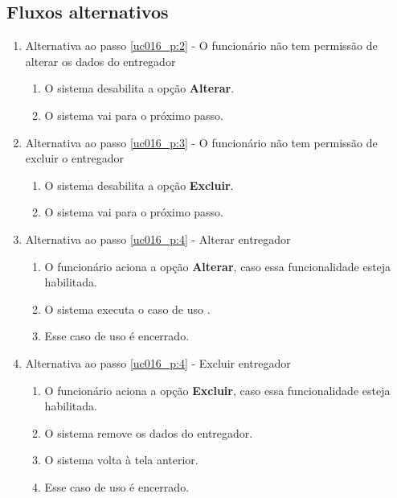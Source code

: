 \subsection{Fluxos alternativos}

\begin{enumerate}[label=A\arabic*]
	\item Alternativa ao passo \ref{uc016_p:2} - O funcionário não tem permissão de alterar os dados do entregador \label{uc016_a:1}
	\begin{enumerate}[label*=.\arabic*]
		\item O sistema desabilita a opção \textbf{Alterar}.
		\item O sistema vai para o próximo passo.
	\end{enumerate}
	
	\item Alternativa ao passo \ref{uc016_p:3} - O funcionário não tem permissão de excluir o entregador \label{uc016_a:2}
	\begin{enumerate}[label*=.\arabic*]
		\item O sistema desabilita a opção \textbf{Excluir}.
		\item O sistema vai para o próximo passo.
	\end{enumerate}
		
	\item Alternativa ao passo \ref{uc016_p:4} - Alterar entregador \label{uc016_a:3}
	\begin{enumerate}[label*=.\arabic*]
		\item O funcionário aciona a opção \textbf{Alterar}, caso essa funcionalidade esteja habilitada.
		\item O sistema executa o caso de uso .
		\item Esse caso de uso é encerrado.
	\end{enumerate}
	
	\item Alternativa ao passo \ref{uc016_p:4} - Excluir entregador \label{uc016_a:4}
	\begin{enumerate}[label*=.\arabic*]
		\item O funcionário aciona a opção \textbf{Excluir}, caso essa funcionalidade esteja habilitada.
		\item O sistema remove os dados do entregador. \label{uc016_a:4:2}
		\item O sistema volta à tela anterior.
		\item Esse caso de uso é encerrado.
	\end{enumerate}
\end{enumerate}

